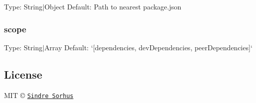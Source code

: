 Type\+: {\ttfamily String$\vert$\+Object} Default\+: Path to nearest package.\+json

\subsubsection*{scope}

Type\+: {\ttfamily String$\vert$\+Array} Default\+: `\mbox{[}\textquotesingle{}dependencies\textquotesingle{}, \textquotesingle{}dev\+Dependencies\textquotesingle{}, \textquotesingle{}peer\+Dependencies\textquotesingle{}\mbox{]}`

\subsection*{License}

M\+IT © \href{http://sindresorhus.com}{\tt Sindre Sorhus} 